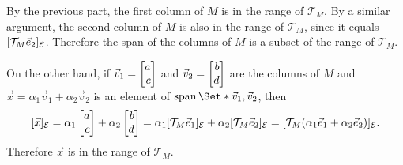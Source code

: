 \documentclass{workbook}
\begin{document}
\begin{slide}
\begin{parts}
\begin{solution}
				By the previous part, the first column of $M$ is in the range of
				$\mathcal T_M$. By a similar argument, the second column of $M$ is also
				in the range of $\mathcal T_M$, since it equals $[\mathcal T_M{\vec e_2}]_{\mathcal E}$.
				Therefore the span of the columns of $M$ is a subset of the range
				of $\mathcal T_M$.

				On the other hand, if $\vec v_1=\mat{a\\c}$ and $\vec v_2=\mat{b\\d}$
				are the columns of $M$ and $\vec x = \alpha_1\vec v_1+\alpha_2\vec v_2$
				is an element of $\Span\Set*{\vec v_1,\vec v_2}$, then
				\[
					[\vec x]_{\mathcal E}
					=\alpha_1\mat{a\\c}+\alpha_2\mat{b\\d}
					=\alpha_1[\mathcal T_M\xhat]_{\mathcal E}+\alpha_2[\mathcal T_M\yhat]_{\mathcal E}
					=[\mathcal T_M(\alpha_1\xhat+\alpha_2\yhat)]_{\mathcal E}.
				\]
				Therefore $\vec x$ is in the range of $\mathcal T_M$.
			\end{solution}
	\end{parts}
\end{slide}
\end{document}
